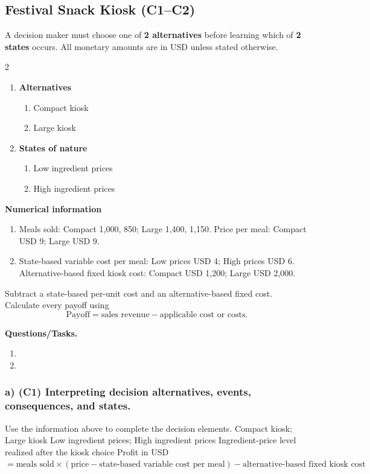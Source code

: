 \subsection{Festival Snack Kiosk (C1--C2)}
\label{sec:problem17-festival-snack-kiosk-c1-c2}
A decision maker must choose one of \textbf{2 alternatives} before learning which of \textbf{2 states} occurs. All monetary amounts are in USD unless stated otherwise.
\begin{multicols}{2}
\begin{enumerate}[label=\arabic*.]
 \item \textbf{Alternatives}
 \begin{enumerate}[label=\roman*)]
  \item Compact kiosk
  \item Large kiosk
 \end{enumerate}
 \item \textbf{States of nature}
 \begin{enumerate}[label=\roman*)]
  \item Low ingredient prices
  \item High ingredient prices
 \end{enumerate}
\end{enumerate}
\end{multicols}
 \textbf{Numerical information}
 \begin{enumerate}[label=\roman*)]
  \item Meals sold: Compact 1,000, 850; Large 1,400, 1,150. Price per meal: Compact USD 9; Large USD 9.
  \item State-based variable cost per meal: Low prices USD 4; High prices USD 6. Alternative-based fixed kiosk cost: Compact USD 1,200; Large USD 2,000.
 \end{enumerate}
Subtract a state-based per-unit cost and an alternative-based fixed cost. Calculate every payoff using
\[
 \text{Payoff}=\text{sales revenue}-\text{applicable cost or costs}.
\]

\textbf{Questions/Tasks.}
\begin{enumerate}[label=\textbf{\alph*)}]
 \item {}
 \item {}
\end{enumerate}
\subsubsection*{a) \textbf{(C1)} Interpreting decision alternatives, events, consequences, and states.}
\label{subsec:problem17-festival-snack-kiosk-c1}
Use the information above to complete the decision elements.
\DecisionElementsTable
{Compact kiosk; Large kiosk}
{Low ingredient prices; High ingredient prices}
{Ingredient-price level realized after the kiosk choice}
{Profit in USD $= \text{meals sold} \times (\text{price} - \text{state-based variable cost per meal}) - \text{alternative-based fixed kiosk cost}$}
